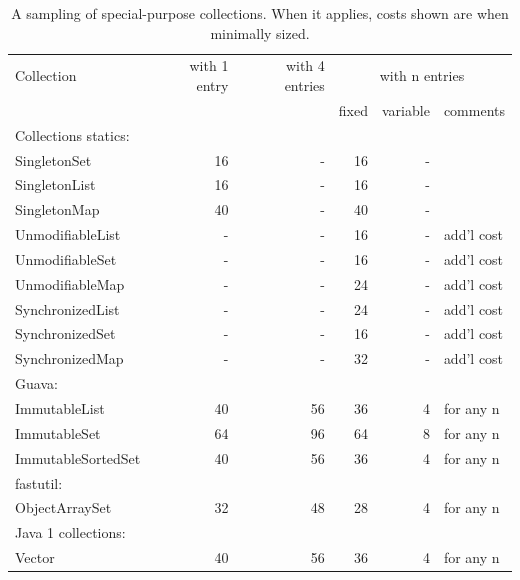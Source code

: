 \begin{table}
\centering
 		\begin{tabular}{l||r||r||rrl}
 		\toprule
	 	 Collection & with 1 entry & with 4 entries &
	 	 \multicolumn{3}{c}{with n entries}\\
	 	 & & & fixed & variable & comments \\
	 	 \midrule
	 	\multicolumn{5}{l}{Collections statics:} \\
	 	\midrule
	 	SingletonSet &  16 & - & 16 & - &  \\
	 	SingletonList & 16 & - & 16 & - &  \\
	 	SingletonMap &  40 & - & 40 & - &  \\
	 	\midrule
	 	UnmodifiableList & - & - & 16 & - & add'l cost \\
	 	UnmodifiableSet & - & - & 16 & - & add'l cost \\
	 	UnmodifiableMap & - & - & 24 & - & add'l cost \\
	 	\midrule
	 	SynchronizedList & - & - & 24  & - & add'l cost \\	 	
	 	SynchronizedSet & - & - & 16  & - & add'l cost \\	 	
	 	SynchronizedMap & - & - & 32  & - & add'l cost \\	 	
	 	\midrule
	 	\multicolumn{5}{l}{Guava:} \\
	 	\midrule
	 	ImmutableList & 40 & 56 & 36 \footnotemark[1] & 4 & for any n \\
	 	ImmutableSet & 64 & 96 & 64 \footnotemark[2] & 8 & for any n \\
	 	ImmutableSortedSet & 40 & 56 & 36 \footnotemark[1] & 4 & for any n \\
	 	 \midrule
	 	\multicolumn{5}{l}{fastutil:} \\
	 	\midrule
	 	ObjectArraySet & 32 & 48 & 28 \footnotemark[1] & 4
	 	& for any n \\
	 	\midrule
	 	\multicolumn{5}{l}{Java 1 collections:} \\
	 	\midrule
	 	Vector & 40 & 56 & 36 \footnotemark[1]  & 4 & for any n\\ 	
	 	\bottomrule
	 	\end{tabular}
	 	
	\caption{A sampling of special-purpose collections. When it applies, costs
	shown are when minimally sized.}
	\label{tab:specialized-collections-small}
\end{table}


